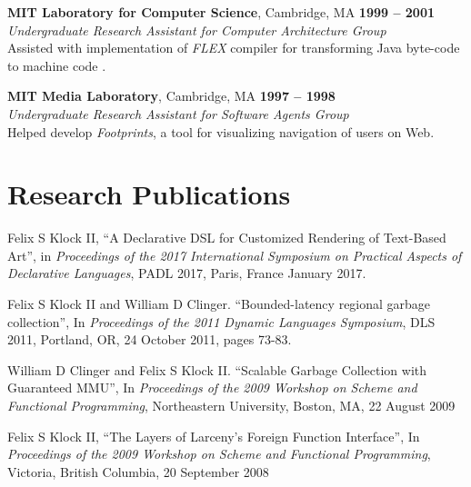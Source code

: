 \documentclass[margin,line,draft]{res}
\def\noneed#1{}
\newcommand{\mysidestyle}{\sc}
\begin{document}
\begin{resume}
    \textbf{MIT Laboratory for Computer Science}, Cambridge, MA  \hfill \textbf{1999 -- 2001}\\\vspace{1mm}%
    \textsl{Undergraduate Research Assistant for Computer Architecture Group}\\
    Assisted with implementation of \emph{FLEX} compiler {for transforming
    Java byte-code to machine code}
    .

    \textbf{MIT Media Laboratory}, Cambridge, MA \hfill \textbf{1997 -- 1998}\\\vspace{1mm}%
    \textsl{Undergraduate Research Assistant for Software Agents Group} \\
    Helped develop \emph{Footprints}, a tool for visualizing navigation of 
    users on Web.


    \section{\mysidestyle Research Publications}

    Felix S Klock II, ``A Declarative DSL for Customized Rendering of Text-Based Art'', in \textsl{Proceedings of the 2017 International Symposium on Practical Aspects of Declarative Languages}, PADL 2017, Paris, France January 2017.

    Felix S Klock II and William D Clinger.  ``Bounded-latency regional garbage collection'', In \textsl{Proceedings of the 2011 Dynamic Languages Symposium}, DLS 2011, Portland, OR, 24 October 2011, pages 73-83.

    William D Clinger and Felix S Klock II. ``Scalable Garbage Collection with Guaranteed MMU'', In \textsl{Proceedings of the 2009 Workshop on Scheme and Functional Programming}, Northeastern University, Boston, MA, 22 August 2009

\vspace{-2mm}

    Felix S Klock II, ``The Layers of Larceny's Foreign Function Interface'', 
    In \textsl{Proceedings of the 2009 Workshop on Scheme and Functional Programming}, Victoria, British Columbia, 20 September 2008


\end{resume}
\end{document}
